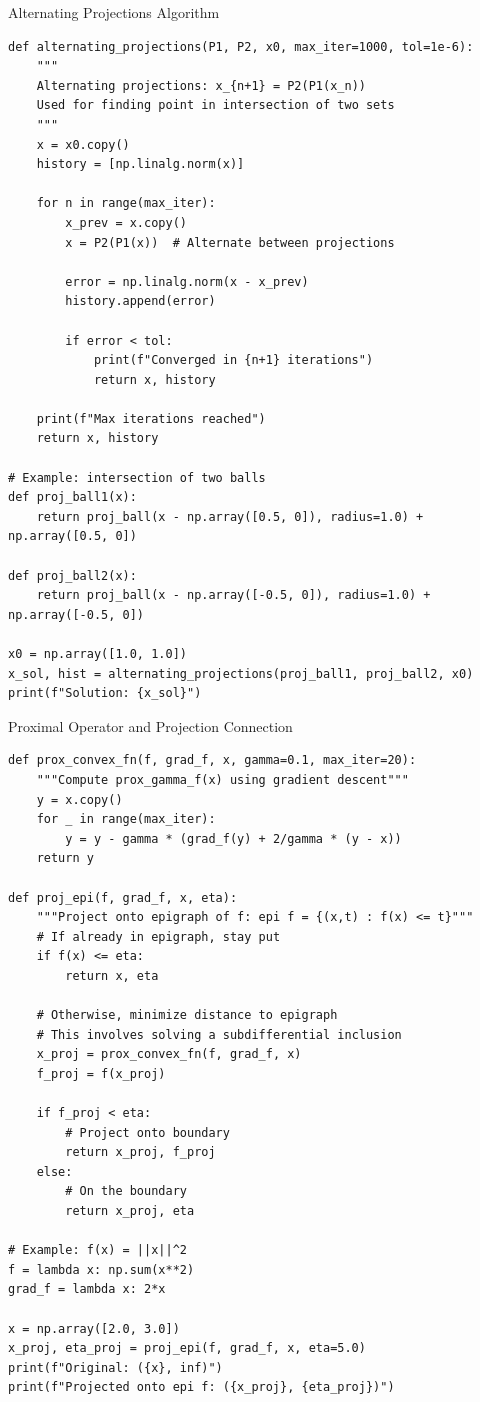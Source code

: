 \documentclass[aspectratio=169,10pt]{beamer}
\begin{document}
\begin{frame}[fragile]{Alternating Projections Algorithm}

    \begin{lstlisting}
def alternating_projections(P1, P2, x0, max_iter=1000, tol=1e-6):
    """
    Alternating projections: x_{n+1} = P2(P1(x_n))
    Used for finding point in intersection of two sets
    """
    x = x0.copy()
    history = [np.linalg.norm(x)]

    for n in range(max_iter):
        x_prev = x.copy()
        x = P2(P1(x))  # Alternate between projections

        error = np.linalg.norm(x - x_prev)
        history.append(error)

        if error < tol:
            print(f"Converged in {n+1} iterations")
            return x, history

    print(f"Max iterations reached")
    return x, history

# Example: intersection of two balls
def proj_ball1(x):
    return proj_ball(x - np.array([0.5, 0]), radius=1.0) + np.array([0.5, 0])

def proj_ball2(x):
    return proj_ball(x - np.array([-0.5, 0]), radius=1.0) + np.array([-0.5, 0])

x0 = np.array([1.0, 1.0])
x_sol, hist = alternating_projections(proj_ball1, proj_ball2, x0)
print(f"Solution: {x_sol}")
    \end{lstlisting}

\end{frame}

\begin{frame}[fragile]{Proximal Operator and Projection Connection}

    \begin{lstlisting}
def prox_convex_fn(f, grad_f, x, gamma=0.1, max_iter=20):
    """Compute prox_gamma_f(x) using gradient descent"""
    y = x.copy()
    for _ in range(max_iter):
        y = y - gamma * (grad_f(y) + 2/gamma * (y - x))
    return y

def proj_epi(f, grad_f, x, eta):
    """Project onto epigraph of f: epi f = {(x,t) : f(x) <= t}"""
    # If already in epigraph, stay put
    if f(x) <= eta:
        return x, eta

    # Otherwise, minimize distance to epigraph
    # This involves solving a subdifferential inclusion
    x_proj = prox_convex_fn(f, grad_f, x)
    f_proj = f(x_proj)

    if f_proj < eta:
        # Project onto boundary
        return x_proj, f_proj
    else:
        # On the boundary
        return x_proj, eta

# Example: f(x) = ||x||^2
f = lambda x: np.sum(x**2)
grad_f = lambda x: 2*x

x = np.array([2.0, 3.0])
x_proj, eta_proj = proj_epi(f, grad_f, x, eta=5.0)
print(f"Original: ({x}, inf)")
print(f"Projected onto epi f: ({x_proj}, {eta_proj})")
    \end{lstlisting}

\end{frame}
\end{document}
